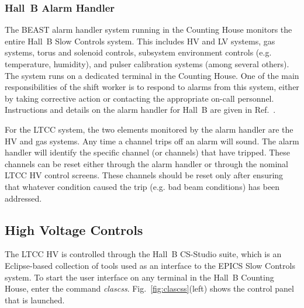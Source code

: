 \documentclass{article}
\begin{document}
\clearpage
\subsubsection{Hall~B Alarm Handler}
\label{alarms}

The BEAST alarm handler system running in the Counting House monitors the entire Hall~B Slow Controls
system. This includes HV and LV systems, gas systems, torus and solenoid controls, subsystem
environment controls (e.g. temperature, humidity), and pulser calibration systems (among several
others). The system runs on a dedicated terminal in the Counting House. One of the main responsibilities
of the shift worker is to respond to alarms from this system, either by taking corrective action
or contacting the appropriate on-call personnel. Instructions and details on the alarm handler for Hall~B
are given in Ref.~\cite{beast}.

For the LTCC system, the two elements monitored by the alarm handler are the HV and gas systems.
Any time a channel trips off an alarm will sound. The alarm handler will identify the specific
channel (or channels) that have tripped. These channels can be reset either through the alarm handler
or through the nominal LTCC HV control screens. These channels should be reset only after ensuring
that whatever condition caused the trip (e.g. bad beam conditions) has been addressed.

\subsection{High Voltage Controls}
\label{hv-control}

The LTCC HV is controlled through the Hall~B CS-Studio suite, which is an Eclipse-based collection 
of tools used as an interface to the EPICS Slow Controls system. To start the user interface on any 
terminal in the Hall~B Counting House, enter the command {\it clascss}. Fig.~\ref{fig:clascss}(left) 
shows the control panel that is launched.
\end{document}
